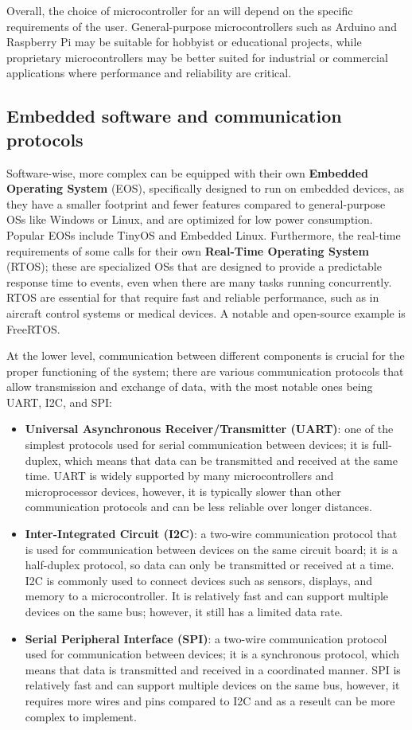 Overall, the choice of microcontroller for an \es will depend on the specific requirements of the user. General-purpose microcontrollers such as Arduino and Raspberry Pi may be suitable for hobbyist or educational projects, while proprietary microcontrollers may be better suited for industrial or commercial applications where performance and reliability are critical.


\subsection{Embedded software and communication protocols}
Software-wise, more complex \ess can be equipped with their own \textbf{Embedded Operating System} (EOS), specifically designed to run on embedded devices, as they have a smaller footprint and fewer features compared to general-purpose OSs like Windows or Linux, and are optimized  for low power consumption. Popular EOSs include TinyOS and Embedded Linux.
Furthermore, the real-time requirements of some \ess calls for their own \textbf{Real-Time Operating System} (RTOS); these are specialized OSs that are designed to provide a predictable response time to events, even when there are many tasks running concurrently. RTOS are essential for \es that require fast and reliable performance, such as in aircraft control systems or medical devices. A notable and open-source example is FreeRTOS. 


At the lower level, communication between different components is crucial for the proper functioning of the system; there are various communication protocols that allow transmission and exchange of data, with the most notable ones being UART, I2C, and SPI:
\begin{itemize}
    \item \textbf{Universal Asynchronous Receiver/Transmitter (UART)}: one of the simplest protocols used for serial communication between devices; it is full-duplex, which means that data can be transmitted and received at the same time. UART is widely supported by many microcontrollers and microprocessor devices, however, it is typically slower than other communication protocols and can be less reliable over longer distances.
    \item \textbf{Inter-Integrated Circuit (I2C)}: a two-wire communication protocol that is used for communication between devices on the same circuit board; it is a half-duplex protocol, so data can only be transmitted or received at a time. I2C is commonly used to connect devices such as sensors, displays, and memory to a microcontroller. It is relatively fast and can support multiple devices on the same bus; however, it still has a limited data rate.
    \item \textbf{Serial Peripheral Interface (SPI)}: a two-wire communication protocol used for communication between devices; it is a synchronous protocol, which means that data is transmitted and received in a coordinated manner. SPI is relatively fast and can support multiple devices on the same bus, however, it requires more wires and pins compared to I2C and as a reseult can be more complex to implement.
\end{itemize} 


